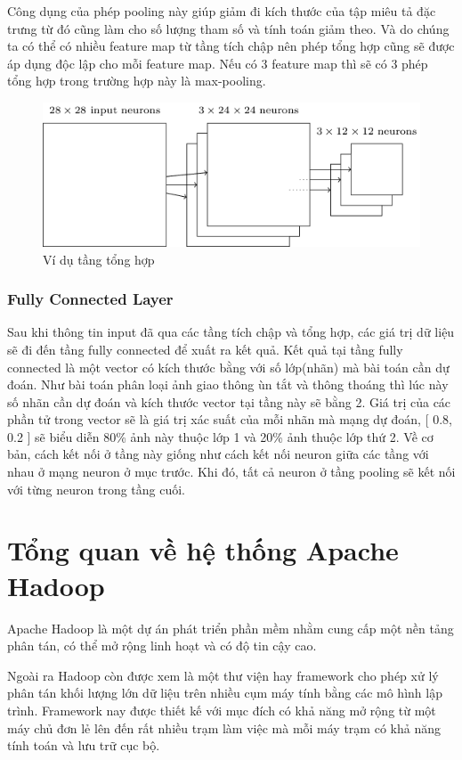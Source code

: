 		Công dụng của phép pooling này giúp giảm đi kích thước của tập miêu tả đặc trưng từ đó cũng làm cho số lượng tham số và tính toán giảm theo. Và do chúng ta có thể có nhiều feature map từ tầng tích chập nên phép tổng hợp cũng sẽ được áp dụng độc lập cho mỗi feature map. Nếu có 3 feature map thì sẽ có 3 phép tổng hợp trong trường hợp này là max-pooling.
		
		\begin{figure}[h!]
			\centering
			\includegraphics[scale=0.5]{charts/pooling_ex.png}
			\caption{Ví dụ tầng tổng hợp \cite{conv-layer}}
			\label{fig:pooling_ex}
		\end{figure}
		
	
	\subsubsection{Fully Connected Layer}
		Sau khi thông tin input đã qua các tầng tích chập và tổng hợp, các giá trị dữ liệu sẽ đi đến tầng fully connected để xuất ra kết quả. Kết quả tại tầng fully connected là một vector có kích thước bằng với số lớp(nhãn) mà bài toán cần dự đoán. Như bài toán phân loại ảnh giao thông ùn tắt và thông thoáng thì lúc này số nhãn cần dự đoán và kích thước vector tại tầng này sẽ bằng 2. Giá trị của các phần tử trong vector sẽ là giá trị xác suất của mỗi nhãn mà mạng dự đoán, [ 0.8, 0.2 ] sẽ biểu diễn 80\% ảnh này thuộc lớp 1 và 20\% ảnh thuộc lớp thứ 2. Về cơ bản, cách kết nối ở tầng này giống như cách kết nối neuron giữa các tầng với nhau ở mạng neuron ở mục trước. Khi đó, tất cả neuron ở tầng pooling sẽ kết nối với từng neuron trong tầng cuối.


\section{Tổng quan về hệ thống Apache Hadoop}
Apache Hadoop là một dự án phát triển phần mềm nhằm cung cấp một nền tảng phân tán, có thể mở rộng linh hoạt và có độ tin cậy cao.\par
Ngoài ra Hadoop còn được xem là một thư viện hay framework cho phép xử lý phân tán khối lượng lớn dữ liệu trên nhiều cụm máy tính bằng các mô hình lập trình. Framework nay được thiết kế với mục đích có khả năng mở rộng từ một máy chủ đơn lẻ lên đến rất nhiều trạm làm việc mà mỗi máy trạm có khả năng tính toán và lưu trữ cục bộ.
